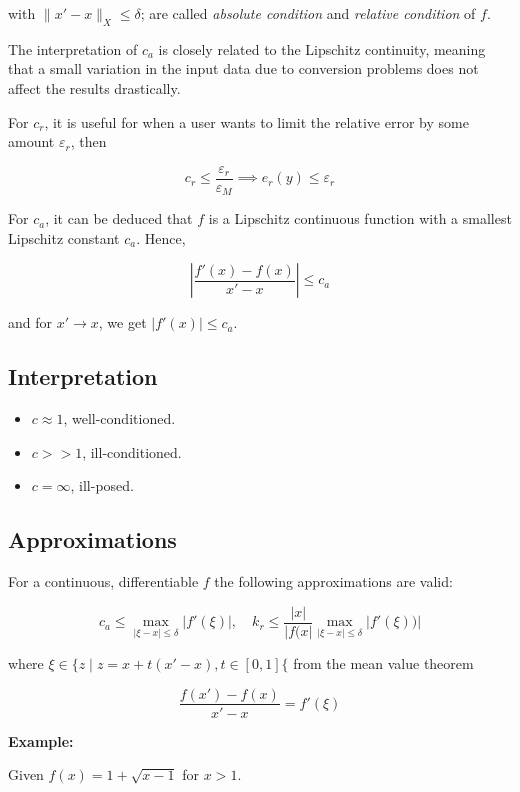 with \(\|x' - x\|_X \le \delta\); are called \emph{absolute condition} and \emph{relative condition} of \(f\).

The interpretation of \(c_a\) is closely related to the Lipschitz continuity, meaning that a small variation in the 
input data due to conversion problems does not affect the results drastically.

For \(c_r\), it is useful for when a user wants to limit the relative error by some amount \(\varepsilon_r\), then

\[
    c_r \le \frac{\varepsilon_r}{\varepsilon_M} \implies e_r (y) \le \varepsilon_r
\]

For \(c_a\), it can be deduced that \(f\) is a Lipschitz continuous function with a smallest 
Lipschitz constant \(c_a\). Hence, 

\[
    \left|\frac{f'(x) - f(x)}{x' - x}\right| \le c_a
\]

and for \(x' \to x\), we get \(|f'(x)| \le c_a\).

\subsection{Interpretation}

\begin{itemize}
    \item \(c \approx 1\), well-conditioned.

    \item \(c >> 1\), ill-conditioned.

    \item \(c = \infty\), ill-posed.
\end{itemize}

\subsection{Approximations}

For a continuous, differentiable \(f\) the following approximations are valid: 

\[
    c_a \le \max_{|\xi - x| \le \delta} |f'(\xi)|, \quad k_r \le \frac{|x|}{|f(x|} \max_{|\xi - x| \le \delta} |f'(\xi))|
\]

where \(\xi \in \{z \mid z = x + t(x' - x), t \in [0, 1]\{\) from the mean value theorem 

\[
    \frac{f(x') - f(x)}{x' - x} = f'(\xi)
\]

\textbf{Example:}

Given \(f(x) = 1 + \sqrt{x - 1}\) for \(x > 1\).

